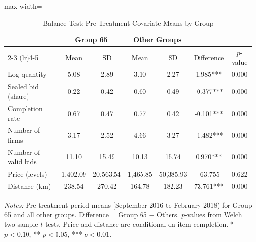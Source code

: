 \begin{table}[htbp]
\centering
\caption{Balance Test: Pre-Treatment Covariate Means by Group}
\label{tab:balance}
\begin{adjustbox}{max width=\textwidth}
\begin{threeparttable}
\small
\begin{tabular}{lcccccc}
\toprule
 & \multicolumn{2}{c}{Group 65} & \multicolumn{2}{c}{Other Groups} & & \\
\cmidrule(lr){2-3} \cmidrule(lr){4-5}
 & Mean & SD & Mean & SD & Difference & $p$-value \\
\midrule
Log quantity & 5.08 & 2.89 & 3.10 & 2.27 & 1.985*** & 0.000 \\
Sealed bid (share) & 0.22 & 0.42 & 0.60 & 0.49 & -0.377*** & 0.000 \\
Completion rate & 0.67 & 0.47 & 0.77 & 0.42 & -0.101*** & 0.000 \\
Number of firms & 3.17 & 2.52 & 4.66 & 3.27 & -1.482*** & 0.000 \\
Number of valid bids & 11.10 & 15.49 & 10.13 & 15.74 & 0.970*** & 0.000 \\
Price (levels) & 1,402.09 & 20,563.54 & 1,465.85 & 50,385.93 & -63.755 & 0.622 \\
Distance (km) & 238.54 & 270.42 & 164.78 & 182.23 & 73.761*** & 0.000 \\
\bottomrule
\end{tabular}
\begin{tablenotes}
\small
\item \textit{Notes:} Pre-treatment period means (September 2016 to February 2018) for Group 65 and all other groups. Difference = Group 65 $-$ Others. $p$-values from Welch two-sample $t$-tests. Price and distance are conditional on item completion. * $p<0.10$, ** $p<0.05$, *** $p<0.01$.
\end{tablenotes}
\end{threeparttable}
\end{adjustbox}
\end{table}

